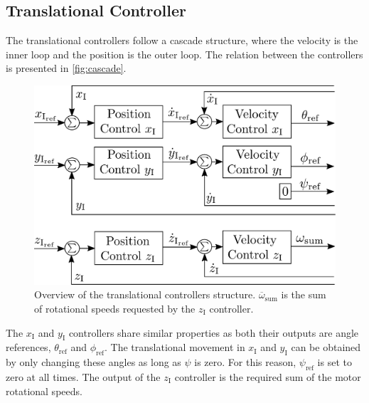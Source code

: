 \subsection{Translational Controller}
The translational controllers follow a cascade structure, where the velocity is the inner loop and the position is the outer loop. The relation between the controllers is presented in \autoref{fig:cascade}.
%
\begin{figure}[H]
\centering
	\includegraphics[width=.42\textwidth]{figures/TranslationalControlDiagramSmall.pdf}
	\caption{Overview of the translational controllers structure. $\overline{\omega}_{\mathrm{sum}}$ is the sum of rotational speeds requested by the $z_{\mathrm{I}}$ controller.}
	\label{fig:cascade}
\end{figure}

The $x_{\mathrm{I}}$ and $y_{\mathrm{I}}$ controllers share similar properties as both their outputs are angle references, $\theta_{\mathrm{ref}}$ and $\phi_{\mathrm{ref}}$. The translational movement in $x_{\mathrm{I}}$ and $y_{\mathrm{I}}$ can be obtained by only changing these angles as long as $\psi$ is zero. For this reason, $\psi_{\mathrm{ref}}$ is set to zero at all times. The output of the $z_{\mathrm{I}}$ controller is the required sum of the motor rotational speeds.

